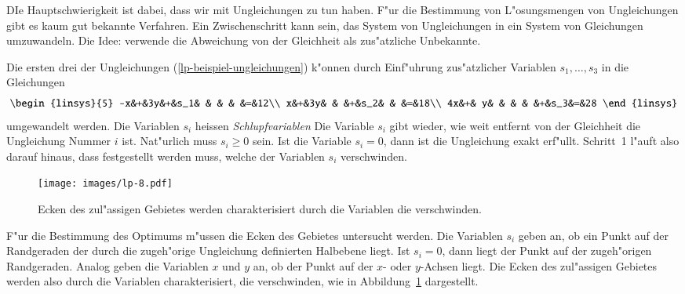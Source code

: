 DIe Hauptschwierigkeit ist dabei, dass wir mit Ungleichungen zu tun
haben.
F"ur die Bestimmung von L"osungsmengen von Ungleichungen gibt
es kaum gut bekannte Verfahren.
Ein Zwischenschritt kann sein, das System von Ungleichungen in
ein System von Gleichungen umzuwandeln.
Die Idee: verwende die Abweichung von der Gleichheit als zus"atzliche
Unbekannte.

Die ersten drei der Ungleichungen (\ref{lp-beispiel-ungleichungen})
k"onnen durch
Einf"uhrung zus"atzlicher Variablen $s_1,\dots,s_3$ in die Gleichungen
\begin{equation}
\begin{linsys}{5}
-x&+&3y&+&s_1& &   & &   &=&12\\
 x&+&3y& &   &+&s_2& &   &=&18\\
4x&+& y& &   & &   &+&s_3&=&28
\end{linsys}
\label{lp-ungleichungen-schlupf}
\end{equation}
umgewandelt werden.
Die Variablen $s_i$ heissen {\em Schlupfvariablen}
Die Variable $s_i$ gibt wieder, wie weit entfernt von der Gleichheit
die Ungleichung Nummer $i$ ist.
Nat"urlich muss $s_i\ge 0$ sein.
Ist die Variable $s_i=0$, dann ist die Ungleichung exakt erf"ullt.
Schritt~1 l"auft also darauf hinaus, dass festgestellt werden muss,
welche der Variablen $s_i$ verschwinden.

\begin{figure}
\begin{center}
\texttt{[image: images/lp-8.pdf]}
\end{center}
\caption{Ecken des zul"assigen Gebietes werden charakterisiert durch
die Variablen die verschwinden.
\label{lp:corners}}
\end{figure}
F"ur die Bestimmung des Optimums m"ussen die Ecken des Gebietes 
untersucht werden. Die Variablen $s_i$ geben an, ob ein Punkt auf
der Randgeraden der durch die zugeh"orige Ungleichung definierten
Halbebene liegt.
Ist $s_i=0$, dann liegt der Punkt auf der zugeh"origen Randgeraden.
Analog geben die Variablen $x$ und $y$ an, ob der Punkt auf der
$x$- oder $y$-Achsen liegt. Die Ecken des zul"assigen Gebietes
werden also durch die Variablen charakterisiert, die verschwinden,
wie in Abbildung~\ref{lp:corners} dargestellt.

